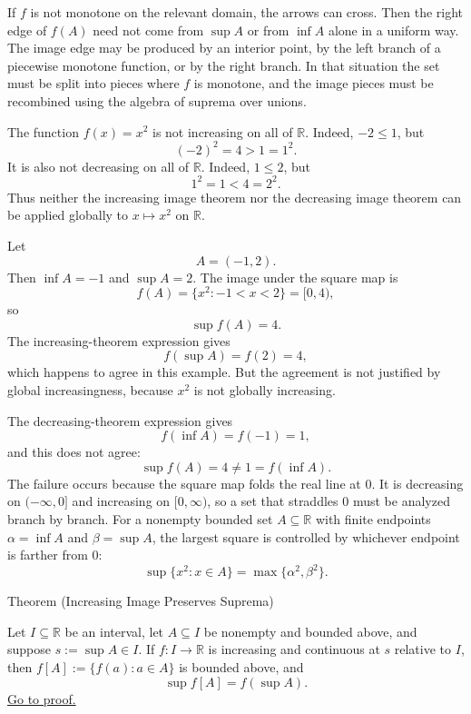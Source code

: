 \begin{example*}
\begin{center}

\end{center}
If $f$ is not monotone on the relevant domain, the arrows can cross.  Then the
right edge of $f(A)$ need not come from $\sup A$ or from $\inf A$ alone in a
uniform way.  The image edge may be produced by an interior point, by the left
branch of a piecewise monotone function, or by the right branch.  In that
situation the set must be split into pieces where $f$ is monotone, and the
image pieces must be recombined using the algebra of suprema over unions.
\end{example*}

\begin{example*}
The function $f(x)=x^2$ is not increasing on all of $\mathbb{R}$.  Indeed,
$-2\leq 1$, but
\[
  (-2)^2=4>1=1^2.
\]
It is also not decreasing on all of $\mathbb{R}$.  Indeed, $1\leq 2$, but
\[
  1^2=1<4=2^2.
\]
Thus neither the increasing image theorem nor the decreasing image theorem can
be applied globally to $x\mapsto x^2$ on $\mathbb{R}$.

Let
\[
  A=(-1,2).
\]
Then $\inf A=-1$ and $\sup A=2$.  The image under the square map is
\[
  f(A)=\{x^2:-1<x<2\}=[0,4),
\]
so
\[
  \sup f(A)=4.
\]
The increasing-theorem expression gives
\[
  f(\sup A)=f(2)=4,
\]
which happens to agree in this example.  But the agreement is not justified by
global increasingness, because $x^2$ is not globally increasing.

The decreasing-theorem expression gives
\[
  f(\inf A)=f(-1)=1,
\]
and this does not agree:
\[
  \sup f(A)=4\neq 1=f(\inf A).
\]
The failure occurs because the square map folds the real line at $0$.  It is
decreasing on $(-\infty,0]$ and increasing on $[0,\infty)$, so a set that
straddles $0$ must be analyzed branch by branch.  For a nonempty bounded set
$A\subseteq\mathbb{R}$ with finite endpoints $\alpha=\inf A$ and
$\beta=\sup A$, the largest square is controlled by whichever endpoint is
farther from $0$:
\[
  \sup\{x^2:x\in A\}=\max\{\alpha^2,\beta^2\}.
\]
\end{example*}

\begin{theorembox}{Theorem (Increasing Image Preserves Suprema)}
\begin{theorem}
\label{thm:increasing-image-preserves-suprema}
Let $I\subseteq\mathbb{R}$ be an interval, let $A\subseteq I$ be nonempty and
bounded above, and suppose $s:=\sup A\in I$.  If $f\colon I\to\mathbb{R}$ is
increasing and continuous at $s$ relative to $I$, then
$f[A]:=\{f(a):a\in A\}$ is bounded above, and
\[
  \sup f[A]=f(\sup A).
\]
\hyperref[prf:increasing-image-preserves-suprema]{Go to proof.}
\end{theorem}
\end{theorembox}

